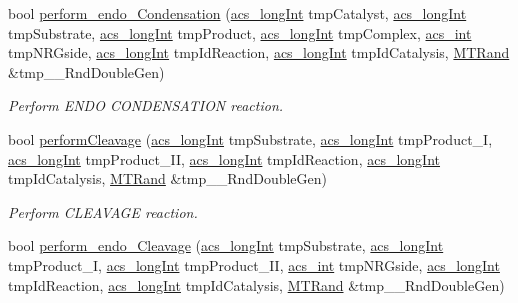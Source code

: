 \begin{DoxyCompactItemize}
bool \hyperlink{a00011_aa7a2cc95d8ba242c805a8fda063b23a7}{perform\-\_\-endo\-\_\-\-Condensation} (\hyperlink{a00024_a19319d75f02db4308bc5c0026d98cd85}{acs\-\_\-long\-Int} tmp\-Catalyst, \hyperlink{a00024_a19319d75f02db4308bc5c0026d98cd85}{acs\-\_\-long\-Int} tmp\-Substrate, \hyperlink{a00024_a19319d75f02db4308bc5c0026d98cd85}{acs\-\_\-long\-Int} tmp\-Product, \hyperlink{a00024_a19319d75f02db4308bc5c0026d98cd85}{acs\-\_\-long\-Int} tmp\-Complex, \hyperlink{a00024_a8d277355641a098190360234e2ebde35}{acs\-\_\-int} tmp\-N\-R\-Gside, \hyperlink{a00024_a19319d75f02db4308bc5c0026d98cd85}{acs\-\_\-long\-Int} tmp\-Id\-Reaction, \hyperlink{a00024_a19319d75f02db4308bc5c0026d98cd85}{acs\-\_\-long\-Int} tmp\-Id\-Catalysis, \hyperlink{a00016}{M\-T\-Rand} \&tmp\-\_\-\-\_\-\-Rnd\-Double\-Gen)
\begin{DoxyCompactList}\small\item\em Perform E\-N\-D\-O C\-O\-N\-D\-E\-N\-S\-A\-T\-I\-O\-N reaction. \end{DoxyCompactList}\item 
bool \hyperlink{a00011_aa4ed307a123c402166cfc7f6ed99043a}{perform\-Cleavage} (\hyperlink{a00024_a19319d75f02db4308bc5c0026d98cd85}{acs\-\_\-long\-Int} tmp\-Substrate, \hyperlink{a00024_a19319d75f02db4308bc5c0026d98cd85}{acs\-\_\-long\-Int} tmp\-Product\-\_\-\-I, \hyperlink{a00024_a19319d75f02db4308bc5c0026d98cd85}{acs\-\_\-long\-Int} tmp\-Product\-\_\-\-I\-I, \hyperlink{a00024_a19319d75f02db4308bc5c0026d98cd85}{acs\-\_\-long\-Int} tmp\-Id\-Reaction, \hyperlink{a00024_a19319d75f02db4308bc5c0026d98cd85}{acs\-\_\-long\-Int} tmp\-Id\-Catalysis, \hyperlink{a00016}{M\-T\-Rand} \&tmp\-\_\-\-\_\-\-Rnd\-Double\-Gen)
\begin{DoxyCompactList}\small\item\em Perform C\-L\-E\-A\-V\-A\-G\-E reaction. \end{DoxyCompactList}\item 
bool \hyperlink{a00011_ade26b82a3b48a5bda7e5751cbfd31b04}{perform\-\_\-endo\-\_\-\-Cleavage} (\hyperlink{a00024_a19319d75f02db4308bc5c0026d98cd85}{acs\-\_\-long\-Int} tmp\-Substrate, \hyperlink{a00024_a19319d75f02db4308bc5c0026d98cd85}{acs\-\_\-long\-Int} tmp\-Product\-\_\-\-I, \hyperlink{a00024_a19319d75f02db4308bc5c0026d98cd85}{acs\-\_\-long\-Int} tmp\-Product\-\_\-\-I\-I, \hyperlink{a00024_a8d277355641a098190360234e2ebde35}{acs\-\_\-int} tmp\-N\-R\-Gside, \hyperlink{a00024_a19319d75f02db4308bc5c0026d98cd85}{acs\-\_\-long\-Int} tmp\-Id\-Reaction, \hyperlink{a00024_a19319d75f02db4308bc5c0026d98cd85}{acs\-\_\-long\-Int} tmp\-Id\-Catalysis, \hyperlink{a00016}{M\-T\-Rand} \&tmp\-\_\-\-\_\-\-Rnd\-Double\-Gen)

\end{DoxyCompactItemize}
